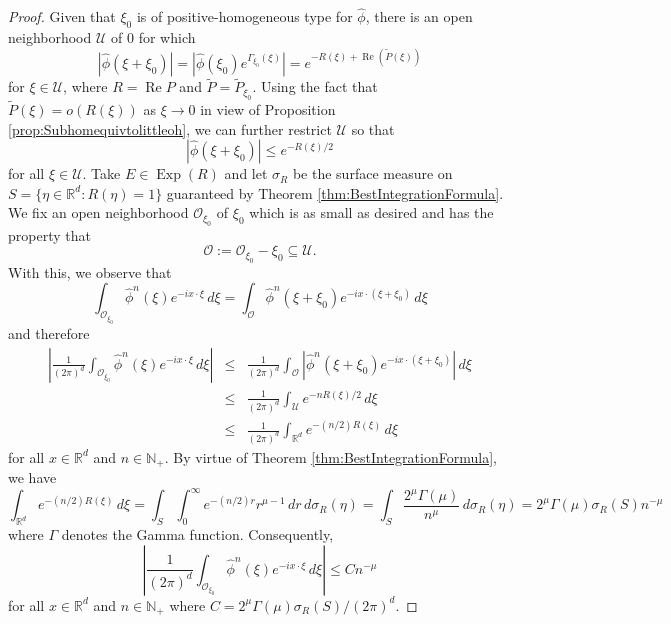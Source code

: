 \documentclass[11pt]{article}
\renewcommand\Re{\operatorname{Re}}%
\newcommand\Exp{\operatorname{Exp}}
\begin{document}
\begin{proof}
Given that $\xi_0$ is of positive-homogeneous type for $\widehat{\phi}$, there is an open neighborhood $\mathcal{U}$ of $0$ for which
\begin{equation*}
    \left|\widehat{\phi}(\xi+\xi_0)\right|=\left|\widehat{\phi}(\xi_0)e^{\Gamma_{\xi_0}(\xi)}\right|=e^{-R(\xi)+\Re\left(\widetilde{P}(\xi)\right)}
\end{equation*}
for $\xi\in \mathcal{U}$, where $R=\Re P$ and $\widetilde{P}=\widetilde{P}_{\xi_0}$. Using the fact that $\widetilde{P}(\xi)=o(R(\xi))$ as $\xi\to 0$ in view of Proposition \ref{prop:Subhomequivtolittleoh}, we can further restrict $\mathcal{U}$ so that
\begin{equation*}
    \left|\widehat{\phi}(\xi+\xi_0)\right|\leq e^{-R(\xi)/2}
\end{equation*}
for all $\xi\in\mathcal{U}$. Take $E\in\Exp(R)$ and let $\sigma_R$ be the surface measure on  $S=\{\eta\in\mathbb{R}^d:R(\eta)=1\}$ guaranteed by Theorem \ref{thm:BestIntegrationFormula}. We fix an open neighborhood $\mathcal{O}_{\xi_0}$ of $\xi_0$ which is as small as desired and has the property that
\begin{equation*}
    \mathcal{O}:=\mathcal{O}_{\xi_0}-\xi_0\subseteq\mathcal{U}.
\end{equation*}
With this, we observe that
\begin{equation*}
\int_{\mathcal{O}_{\xi_0}}\widehat{\phi}^n(\xi)e^{-ix\cdot\xi}\,d\xi=\int_{\mathcal{O}}\widehat{\phi}^n(\xi+\xi_0)e^{-ix\cdot(\xi+\xi_0)}\,d\xi
\end{equation*}
and therefore
\begin{eqnarray*}
    \left|\frac{1}{(2\pi)^d}\int_{\mathcal{O}_{\xi_0}}\widehat{\phi}^n(\xi)e^{-ix\cdot\xi}\,d\xi\right|&\leq& \frac{1}{(2\pi)^d}\int_{\mathcal{O}}\left|\widehat{\phi}^n(\xi+\xi_0)e^{-i x\cdot(\xi+\xi_0)}\right|\,d\xi\\
    &\leq& \frac{1}{(2\pi)^d}\int_{\mathcal{U}}e^{-nR(\xi)/2}\,d\xi\\
    &\leq&\frac{1}{(2\pi)^d}\int_{\mathbb{R}^d} e^{-(n/2)R(\xi)}\,d\xi
\end{eqnarray*}
for all $x\in\mathbb{R}^d$ and $n\in\mathbb{N}_+$. By virtue of Theorem \ref{thm:BestIntegrationFormula}, we have
\begin{equation*}
\int_{\mathbb{R}^d}e^{-(n/2)R(\xi)}\,d\xi=\int_S \int_0^\infty e^{-(n/2)r}r^{\mu-1}\,dr\,d\sigma_R(\eta)=\int_S \frac{2^\mu\Gamma(\mu)}{n^{\mu}}\,d\sigma_R(\eta)=2^\mu\Gamma(\mu)\sigma_R(S)n^{-\mu}
\end{equation*}
where $\Gamma$ denotes the Gamma function. Consequently,
\begin{equation*}
    \left|\frac{1}{(2\pi)^d}\int_{\mathcal{O}_{\xi_0}}\widehat{\phi}^n(\xi)e^{-ix\cdot\xi}\,d\xi\right|\leq C n^{-\mu}
\end{equation*}
for all $x\in\mathbb{R}^d$ and $n\in\mathbb{N}_+$ where $C=2^\mu \Gamma(\mu)\sigma_R(S)/(2\pi)^d.$
\end{proof}
\end{document}
